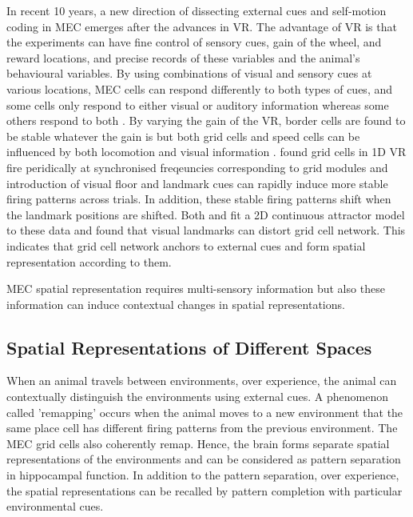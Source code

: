 In recent 10 years, a new direction of dissecting external cues and self-motion coding in MEC emerges after the advances in VR. The advantage of VR is that the experiments can have fine control of sensory cues, gain of the wheel, and reward locations, and precise records of these variables and the animal's behavioural variables. By using combinations of visual and sensory cues at various locations, MEC cells can respond differently to both types of cues, and some cells only respond to either visual or auditory information whereas some others respond to both \cite{nguyen_medial_2024}. By varying the gain of the VR, border cells are found to be stable whatever the gain is but both grid cells and speed cells can be influenced by both locomotion and visual information \cite{campbell_principles_2018}. \cite{wen_one-shot_2024} found grid cells in 1D VR fire peridically at synchronised freqeuncies corresponding to grid modules and introduction of visual floor and landmark cues can rapidly induce more stable firing patterns across trials. In addition, these stable firing patterns shift when the landmark positions are shifted. Both \cite{campbell_principles_2018} and \cite{wen_one-shot_2024} fit a 2D continuous attractor model to these data and found that visual landmarks can distort grid cell network. This indicates that grid cell network anchors to external cues and form spatial representation according to them.

MEC spatial representation requires multi-sensory information but also these information can induce contextual changes in spatial representations.

\subsection{Spatial Representations of Different Spaces}
When an animal travels between environments, over experience, the animal can contextually distinguish the environments using external cues. A phenomenon called 'remapping' occurs when the animal moves to a new environment that the same place cell has different firing patterns from the previous environment. The MEC grid cells also coherently remap. Hence, the brain forms separate spatial representations of the environments and can be considered as pattern separation in hippocampal function\cite{rolls_mechanisms_2013}. In addition to the pattern separation, over experience, the spatial representations can be recalled by pattern completion with particular environmental cues.

